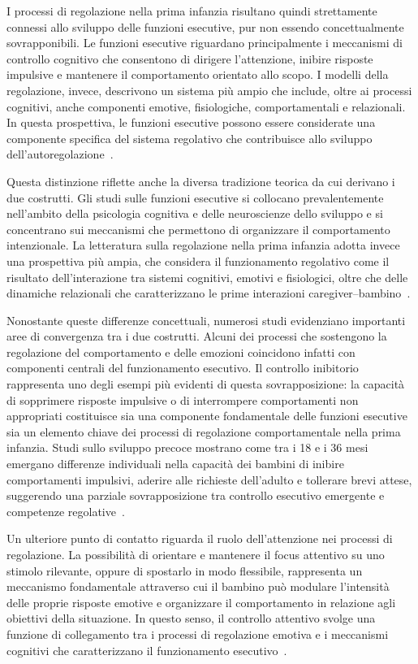         I processi di regolazione nella prima infanzia risultano quindi strettamente connessi allo sviluppo delle funzioni esecutive, pur non essendo concettualmente sovrapponibili. Le funzioni esecutive riguardano principalmente i meccanismi di controllo cognitivo che consentono di dirigere l'attenzione, inibire risposte impulsive e mantenere il comportamento orientato allo scopo. I modelli della regolazione, invece, descrivono un sistema più ampio che include, oltre ai processi cognitivi, anche componenti emotive, fisiologiche, comportamentali e relazionali. In questa prospettiva, le funzioni esecutive possono essere considerate una componente specifica del sistema regolativo che contribuisce allo sviluppo dell'autoregolazione~\cite{blair2015,diamond2013}.

        Questa distinzione riflette anche la diversa tradizione teorica da cui derivano i due costrutti. Gli studi sulle funzioni esecutive si collocano prevalentemente nell'ambito della psicologia cognitiva e delle neuroscienze dello sviluppo e si concentrano sui meccanismi che permettono di organizzare il comportamento intenzionale. La letteratura sulla regolazione nella prima infanzia adotta invece una prospettiva più ampia, che considera il funzionamento regolativo come il risultato dell'interazione tra sistemi cognitivi, emotivi e fisiologici, oltre che delle dinamiche relazionali che caratterizzano le prime interazioni caregiver--bambino~\cite{calkins2007,cole2004}.

        Nonostante queste differenze concettuali, numerosi studi evidenziano importanti aree di convergenza tra i due costrutti. Alcuni dei processi che sostengono la regolazione del comportamento e delle emozioni coincidono infatti con componenti centrali del funzionamento esecutivo. Il controllo inibitorio rappresenta uno degli esempi più evidenti di questa sovrapposizione: la capacità di sopprimere risposte impulsive o di interrompere comportamenti non appropriati costituisce sia una componente fondamentale delle funzioni esecutive sia un elemento chiave dei processi di regolazione comportamentale nella prima infanzia. Studi sullo sviluppo precoce mostrano come tra i 18 e i 36 mesi emergano differenze individuali nella capacità dei bambini di inibire comportamenti impulsivi, aderire alle richieste dell'adulto e tollerare brevi attese, suggerendo una parziale sovrapposizione tra controllo esecutivo emergente e competenze regolative~\cite{kochanska2001,gandolfi2014}.

        Un ulteriore punto di contatto riguarda il ruolo dell'attenzione nei processi di regolazione. La possibilità di orientare e mantenere il focus attentivo su uno stimolo rilevante, oppure di spostarlo in modo flessibile, rappresenta un meccanismo fondamentale attraverso cui il bambino può modulare l'intensità delle proprie risposte emotive e organizzare il comportamento in relazione agli obiettivi della situazione. In questo senso, il controllo attentivo svolge una funzione di collegamento tra i processi di regolazione emotiva e i meccanismi cognitivi che caratterizzano il funzionamento esecutivo~\cite{rothbart2006,diamond2013}.

